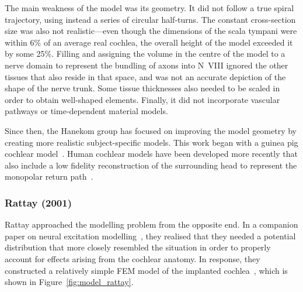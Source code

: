The main weakness of the model was its geometry. It did not follow a true spiral
trajectory, using instead a series of circular half-turns. The constant
cross-section size was also not realistic---even though the dimensions of the
scala tympani were within 6\% of an average real cochlea, the overall height of
the model exceeded it by some 25\%. Filling and assigning the volume in the
centre of the model to a nerve domain to represent the bundling of axons into
N~VIII ignored the other tissues that also reside in that space, and was not an
accurate depiction of the shape of the nerve trunk. Some tissue thicknesses also
needed to be scaled in order to obtain well-shaped elements. Finally, it did not
incorporate vascular pathways or time-dependent material models.

Since then, the Hanekom group has focused on improving the model geometry by
creating more realistic subject-specific models. This work began with a guinea
pig cochlear model~\cite{malherbe2013}. Human cochlear models have been
developed more recently that also include a low fidelity reconstruction of the
surrounding head to represent the monopolar return path~\cite{malherbe2015}.

\subsubsection{Rattay \etal{} (2001)}

Rattay \etal{} approached the modelling problem from the opposite end. In a
companion paper on neural excitation modelling~\cite{rattay2001neuron}, they
realised that they needed a potential distribution that more closely resembled
the \invivo{} situation in order to properly account for effects arising from
the cochlear anatomy. In response, they constructed a relatively simple FEM
model of the implanted cochlea~\cite{rattay2001model}, which is shown in
Figure~\ref{fig:model_rattay}.

